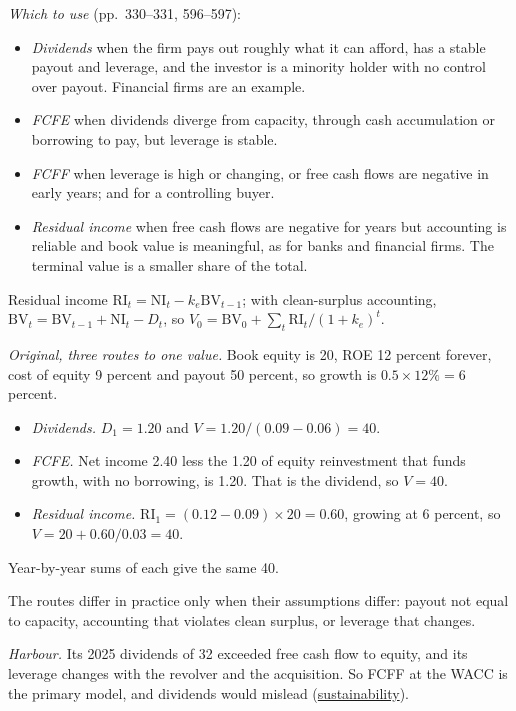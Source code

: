 \begin{qfmethod}
\emph{Which to use} (pp.~330--331, 596--597):
\begin{itemize}
\item \emph{Dividends} when the firm pays out roughly what it can afford, has a stable payout and leverage, and the investor is a minority holder with no control over payout. Financial firms are an example.
\item \emph{FCFE} when dividends diverge from capacity, through cash accumulation or borrowing to pay, but leverage is stable.
\item \emph{FCFF} when leverage is high or changing, or free cash flows are negative in early years; and for a controlling buyer.
\item \emph{Residual income} when free cash flows are negative for years but accounting is reliable and book value is meaningful, as for banks and financial firms. The terminal value is a smaller share of the total.
\end{itemize}

 Residual income $\mathrm{RI}_t=\mathrm{NI}_t-k_e\mathrm{BV}_{t-1}$; with clean-surplus accounting, $\mathrm{BV}_t=\mathrm{BV}_{t-1}+\mathrm{NI}_t-D_t$, so $V_0=\mathrm{BV}_0+\sum_t\mathrm{RI}_t/(1+k_e)^t$.

 \emph{Original, three routes to one value.} Book equity is 20, ROE 12 percent forever, cost of equity 9 percent and payout 50 percent, so growth is $0.5\times12\%=6$ percent.
\begin{itemize}
\item \emph{Dividends.} $D_1=1.20$ and $V=1.20/(0.09-0.06)=40$.
\item \emph{FCFE.} Net income 2.40 less the 1.20 of equity reinvestment that funds growth, with no borrowing, is 1.20. That is the dividend, so $V=40$.
\item \emph{Residual income.} $\mathrm{RI}_1=(0.12-0.09)\times20=0.60$, growing at 6 percent, so $V=20+0.60/0.03=40$.
\end{itemize}
Year-by-year sums of each give the same 40.

The routes differ in practice only when their assumptions differ: payout not equal to capacity, accounting that violates clean surplus, or leverage that changes.

\emph{Harbour.} Its 2025 dividends of 32 exceeded free cash flow to equity, and its leverage changes with the revolver and the acquisition. So FCFF at the WACC is the primary model, and dividends would mislead (\hyperref[meth:dividend-sustainability]{sustainability}).


\end{qfmethod}
